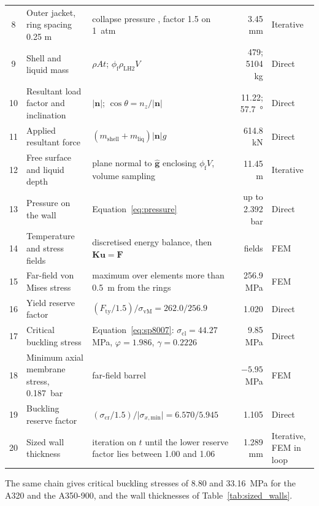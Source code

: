 \begin{table}[!htbp]
\begin{tabularx}{\textwidth}{@{}c>{\raggedright\arraybackslash}p{3.0cm}>{\raggedright\arraybackslash}X r l@{}}
8 & Outer jacket, ring spacing 0.25 m & collapse pressure \cite{ref33}, factor 1.5 on \SI{1}{atm} & 3.45 mm & Iterative \\
9 & Shell and liquid mass & $\rho A t$; $\phi_{\mathrm{f}}\rho_{\mathrm{LH2}}V$ & 479; 5104 kg & Direct \\
10 & Resultant load factor and inclination & $\lvert\mathbf{n}\rvert$; $\cos\theta = n_z/\lvert\mathbf{n}\rvert$ & 11.22; \SI{57.7}{\degree} & Direct \\
11 & Applied resultant force & $(m_{\mathrm{shell}} + m_{\mathrm{liq}})\lvert\mathbf{n}\rvert g$ & 614.8 kN & Direct \\
12 & Free surface and liquid depth & plane normal to $\hat{\mathbf{g}}$ enclosing $\phi_{\mathrm{f}}V$, volume sampling & 11.45 m & Iterative \\
13 & Pressure on the wall & Equation~\eqref{eq:pressure} & up to 2.392 bar & Direct \\
14 & Temperature and stress fields & discretised energy balance, then $\mathbf{K}\mathbf{u} = \mathbf{F}$ & fields & FEM \\
15 & Far-field von Mises stress & maximum over elements more than \SI{0.5}{\metre} from the rings & 256.9 MPa & FEM \\
16 & Yield reserve factor & $(F_{\mathrm{ty}}/1.5)/\sigma_{\mathrm{vM}} = 262.0/256.9$ & 1.020 & Direct \\
17 & Critical buckling stress & Equation~\eqref{eq:sp8007}: $\sigma_{\mathrm{cl}} = 44.27$ MPa, $\varphi = 1.986$, $\gamma = 0.2226$ & 9.85 MPa & Direct \\
18 & Minimum axial membrane stress, \SI{0.187}{\bar} & far-field barrel & $-5.95$ MPa & FEM \\
19 & Buckling reserve factor & $(\sigma_{\mathrm{cr}}/1.5)/\lvert\sigma_{x,\mathrm{min}}\rvert = 6.570/5.945$ & 1.105 & Direct \\
20 & Sized wall thickness & iteration on $t$ until the lower reserve factor lies between 1.00 and 1.06 & 1.289 mm & Iterative, FEM in loop \\
\bottomrule
\end{tabularx}
\end{table}

The same chain gives critical buckling stresses of 8.80 and \SI{33.16}{\mega\pascal} for the A320 and the A350-900, and the wall thicknesses of Table~\ref{tab:sized_walls}.

